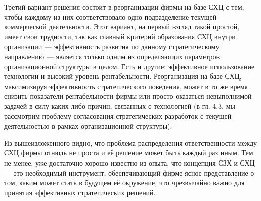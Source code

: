 Третий вариант решения состоит в реорганизации фирмы на базе СХЦ с тем, чтобы каждому из них соответствовало одно подразделение текущей коммерческой деятельности. Этот вариант, на первый взгляд такой простой, имеет свои трудности, так как главный критерий образования СХЦ внутри организации — эффективность развития по данному стратегическому направлению — является только одним из определяющих параметров организационной структуры в целом. Есть и другие: эффективное использование технологии и высокий уровень рентабельности. Реорганизация на базе СХЦ, максимизируя эффективность стратегического поведения, может в то же время снизить показатели рентабельности фирмы или просто оказаться невыполнимой задачей в силу каких-либо причин, связанных с технологией (в гл. 4.3. мы рассмотрим проблему согласования стратегических разработок с текущей деятельностью в рамках организационной структуры).

Из вышеизложенного видно, что проблема распределения ответственности между СХЦ фирмы отнюдь не проста и её решение может быть каждый раз иным. Тем не менее, уже достаточно хорошо известно из опыта, что концепция СЗХ и СХЦ — это необходимый инструмент, обеспечивающий фирме ясное представление о том, каким может стать в будущем её окружение, что чрезвычайно важно для принятия эффективных стратегических решений.